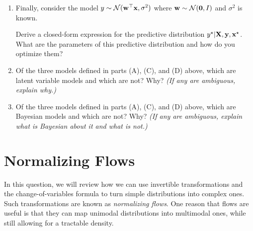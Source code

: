\documentclass[11pt]{article}
\begin{document}
\begin{enumerate}[label=(\Alph*)]
    \item Finally, consider the model $y \sim \mathcal{N}({\mathbf w}^\top {\mathbf x}, \sigma^2)$ where ${\mathbf w} \sim \mathcal{N}(\mathbf{0},I)$ and $\sigma^2$ is known.
    
    Derive a closed-form expression for the predictive distribution $y^\star|{\mathbf X}, {\mathbf y}, {\mathbf x}^\star$. What are the parameters of this predictive distribution and how do you optimize them?


    \item Of the three models defined in parts (A), (C), and (D) above, which are latent variable models and which are not? Why? \textit{(If any are ambiguous, explain why.)}

    
    \item Of the three models defined in parts (A), (C), and (D) above, which are Bayesian models and which are not? Why? \textit{(If any are ambiguous, explain what is Bayesian about it and what is not.)}
    

\end{enumerate} 

\newpage

\section{Normalizing Flows}

In this question, we will review how we can use invertible transformations and the change-of-variables formula to turn simple distributions into complex ones. Such transformations are known as \textit{normalizing flows}. One reason that flows are useful is that they can map unimodal distributions into multimodal ones, while still allowing for a tractable density.
\end{document}
